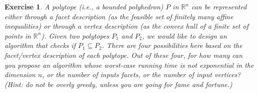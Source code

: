 \documentclass[12pt]{article}
\theoremstyle{colon}
\newtheorem{exercise}{Exercise}
\begin{document}
\clearpage

\begin{exercise}
  A polytope (i.e., a bounded polyhedron) $P$ in $\mathbb{R}^n$ can be represented either through a facet description (as the feasible set of finitely many affine inequalities) or through a vertex description (as the convex hull of a finite set of points in $\mathbb{R}^n$). Given two polytopes $P_1$ and $P_2$, we would like to design an algorithm that checks if $P_1 \subseteq P_2$. There are four possibilities here based on the facet/vertex description of each polytope. Out of these four, for how many can you propose an algorithm whose worst-case running time is not exponential in the dimension $n$, or the number of inputs facets, or the number of input vertices? (Hint: do not be overly greedy, unless you are going for fame and fortune.)
\end{exercise}
\end{document}
